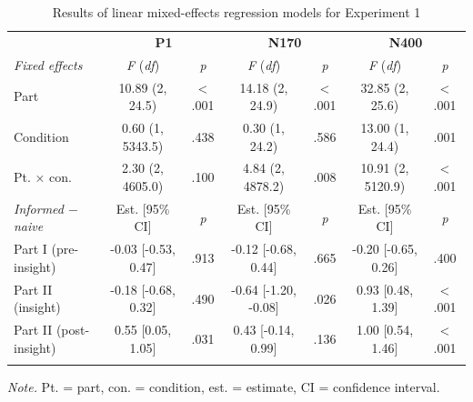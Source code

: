 \documentclass[
  english,
  man,11pt,floatsintext]{apa7}
\begin{document}
\begin{table}[tbp]

\begin{center}
\begin{threeparttable}

\caption{\label{tab:exp1-table}Results of linear mixed-effects regression models for Experiment 1}

\footnotesize{

\begin{tabular}{lcccccc}
\toprule
 & \multicolumn{2}{c}{\textbf{P1}} & \multicolumn{2}{c}{\textbf{N170}} & \multicolumn{2}{c}{\textbf{N400}} \\
\cmidrule(r){2-3} \cmidrule(r){4-5} \cmidrule(r){6-7}
\textit{Fixed effects} & \textit{F} (\textit{df}) & \textit{p} & \textit{F} (\textit{df}) & \textit{p} & \textit{F} (\textit{df}) & \textit{p}\\
\midrule
Part & 10.89 (2, 24.5) & < .001 & 14.18 (2, 24.9) & < .001 & 32.85 (2, 25.6) & < .001\\
Condition & 0.60 (1, 5343.5) & .438 & 0.30 (1, 24.2) & .586 & 13.00 (1, 24.4) & .001\\
Pt. × con. & 2.30 (2, 4605.0) & .100 & 4.84 (2, 4878.2) & .008 & 10.91 (2, 5120.9) & < .001\\
\textit{Informed $-$  naive} & Est. [95\% CI] & \textit{p} & Est. [95\% CI] & \textit{p} & Est. [95\% CI] & \textit{p}\\ \midrule
Part I (pre-insight) & -0.03 [-0.53, 0.47] & .913 & -0.12 [-0.68, 0.44] & .665 & -0.20 [-0.65, 0.26] & .400\\
Part II (insight) & -0.18 [-0.68, 0.32] & .490 & -0.64 [-1.20, -0.08] & .026 & 0.93 [0.48, 1.39] & < .001\\
Part II (post-insight) & 0.55 [0.05, 1.05] & .031 & 0.43 [-0.14, 0.99] & .136 & 1.00 [0.54, 1.46] & < .001\\
\bottomrule
\addlinespace
\end{tabular}

}

\begin{tablenotes}[para]
\normalsize{\textit{Note.} Pt. = part, con. = condition, est. = estimate, CI = confidence interval.}
\end{tablenotes}

\end{threeparttable}
\end{center}

\end{table}
\end{document}

